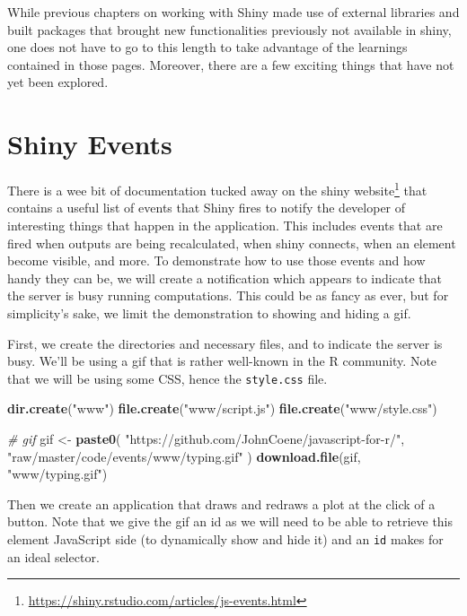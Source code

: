 \documentclass[
  10pt,
]{krantz}
\makeatletter
\newenvironment{Shaded}{\begin{snugshade}}{\end{snugshade}}
\newcommand{\CommentTok}[1]{\textcolor[rgb]{0.37,0.37,0.37}{\textit{#1}}}
\newcommand{\KeywordTok}[1]{\textcolor[rgb]{0.27,0.27,0.27}{\textbf{#1}}}
\newcommand{\NormalTok}[1]{#1}
\newcommand{\StringTok}[1]{\textcolor[rgb]{0.5,0.5,0.5}{#1}}
\renewcommand{\href}[2]{#2\footnote{\url{#1}}}
\newenvironment{kframe}{%
\medskip{}
\setlength{\fboxsep}{.8em}
 \def\at@end@of@kframe{}%
 \ifinner\ifhmode%
  \def\at@end@of@kframe{\end{minipage}}%
  \begin{minipage}{\columnwidth}%
 \fi\fi%
 \def\FrameCommand##1{\hskip\@totalleftmargin \hskip-\fboxsep
 \colorbox{shadecolor}{##1}\hskip-\fboxsep
     \hskip-\linewidth \hskip-\@totalleftmargin \hskip\columnwidth}%
 \MakeFramed {\advance\hsize-\width
   \@totalleftmargin\z@ \linewidth\hsize
   \@setminipage}}%
 {\par\unskip\endMakeFramed%
 \at@end@of@kframe}
\renewenvironment{Shaded}{\begin{kframe}}{\end{kframe}}
\makeatother
\begin{document}
While previous chapters on working with Shiny made use of external libraries and built packages that brought new functionalities previously not available in shiny, one does not have to go to this length to take advantage of the learnings contained in those pages. Moreover, there are a few exciting things that have not yet been explored.

\hypertarget{shiny-tips-events}{%
\section{Shiny Events}\label{shiny-tips-events}}

There is a wee bit of documentation tucked away on the \href{https://shiny.rstudio.com/articles/js-events.html}{shiny website} that contains a useful list of events that Shiny fires to notify the developer of interesting things that happen in the application. This includes events that are fired when outputs are being recalculated, when shiny connects, when an element become visible, and more. To demonstrate how to use those events and how handy they can be, we will create a notification which appears to indicate that the server is busy running computations. This could be as fancy as ever, but for simplicity's sake, we limit the demonstration to showing and hiding a gif.

First, we create the directories and necessary files, and to indicate the server is busy. We'll be using a gif that is rather well-known in the R community. Note that we will be using some CSS, hence the \texttt{style.css} file.

\begin{Shaded}
\begin{Highlighting}[]
\KeywordTok{dir.create}\NormalTok{(}\StringTok{"www"}\NormalTok{)}
\KeywordTok{file.create}\NormalTok{(}\StringTok{"www/script.js"}\NormalTok{)}
\KeywordTok{file.create}\NormalTok{(}\StringTok{"www/style.css"}\NormalTok{)}

\CommentTok{\# gif}
\NormalTok{gif <{-}}\StringTok{ }\KeywordTok{paste0}\NormalTok{(}
  \StringTok{"https://github.com/JohnCoene/javascript{-}for{-}r/"}\NormalTok{,}
  \StringTok{"raw/master/code/events/www/typing.gif"}
\NormalTok{)}
\KeywordTok{download.file}\NormalTok{(gif, }\StringTok{"www/typing.gif"}\NormalTok{)}
\end{Highlighting}
\end{Shaded}

Then we create an application that draws and redraws a plot at the click of a button. Note that we give the gif an id as we will need to be able to retrieve this element JavaScript side (to dynamically show and hide it) and an \texttt{id} makes for an ideal selector.
\end{document}
